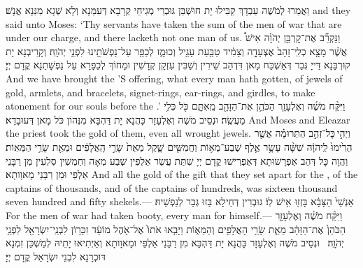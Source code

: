 {וַאֲמַרוּ לְמֹשֶׁה עַבְדָךְ קַבִּילוּ יָת חוּשְׁבַּן גּוּבְרֵי מְגִיחֵי קְרָבָא דְּעִמַּנָא וְלָא שְׁגָא מִנַּנָא אֱנָשׁ׃}
{and they said unto Moses: ‘Thy servants have taken the sum of the men of war that are under our charge, and there lacketh not one man of us.}{}
{וַנַּקְרֵ֞ב אֶת־קׇרְבַּ֣ן יְהֹוָ֗ה אִישׁ֩ אֲשֶׁ֨ר מָצָ֤א כְלִֽי־זָהָב֙ אֶצְעָדָ֣ה וְצָמִ֔יד טַבַּ֖עַת עָגִ֣יל וְכוּמָ֑ז לְכַפֵּ֥ר עַל־נַפְשֹׁתֵ֖ינוּ לִפְנֵ֥י יְהֹוָֽה׃
}
{וְקָרֵיבְנָא יָת קוּרְבָּנָא דַּייָ גְּבַר דְּאַשְׁכַּח מָאן דִּדְהַב שֵׁירִין וְשַׁבִּין עִזְקָן קְדָשִׁין וּמָחוֹךְ לְכַפָּרָא עַל נַפְשָׁתַנָא קֳדָם יְיָ׃}
{And we have brought the \lord’S offering, what every man hath gotten, of jewels of gold, armlets, and bracelets, signet-rings, ear-rings, and girdles, to make atonement for our souls before the \lord.’}{}
{וַיִּקַּ֨ח מֹשֶׁ֜ה וְאֶלְעָזָ֧ר הַכֹּהֵ֛ן אֶת־הַזָּהָ֖ב מֵֽאִתָּ֑ם כֹּ֖ל כְּלִ֥י מַעֲשֶֽׂה׃}
{וּנְסֵיב מֹשֶׁה וְאֶלְעָזָר כָּהֲנָא יָת דַּהְבָּא מִנְּהוֹן כֹּל מָאן דְּעוּבָדָא׃}
{And Moses and Eleazar the priest took the gold of them, even all wrought jewels.}{}
{וַיְהִ֣י \legarmeh  כׇּל־זְהַ֣ב הַתְּרוּמָ֗ה אֲשֶׁ֤ר הֵרִ֙ימוּ֙ לַֽיהֹוָ֔ה שִׁשָּׁ֨ה עָשָׂ֥ר אֶ֛לֶף שְׁבַע־מֵא֥וֹת וַחֲמִשִּׁ֖ים שָׁ֑קֶל מֵאֵת֙ שָׂרֵ֣י הָֽאֲלָפִ֔ים וּמֵאֵ֖ת שָׂרֵ֥י הַמֵּאֽוֹת׃}
{וַהֲוָה כָּל דְּהַב אַפְרָשׁוּתָא דְּאַפְרִישׁוּ קֳדָם יְיָ שִׁתַּת עֲשַׂר אַלְפִין שְׁבַע מְאָה וְחַמְשִׁין סִלְעִין מִן רַבָּנֵי אַלְפֵי וּמִן רַבָּנֵי מָאוָותָא׃}
{And all the gold of the gift that they set apart for the \lord, of the captains of thousands, and of the captains of hundreds, was sixteen thousand seven hundred and fifty shekels.—}{}
{אַנְשֵׁי֙ הַצָּבָ֔א בָּזְז֖וּ אִ֥ישׁ לֽוֹ׃}
{גּוּבְרִין דְּחֵילָא בַּזוּ גְּבַר לְנַפְשֵׁיהּ׃}
{For the men of war had taken booty, every man for himself.—}{}
{וַיִּקַּ֨ח מֹשֶׁ֜ה וְאֶלְעָזָ֤ר הַכֹּהֵן֙ אֶת־הַזָּהָ֔ב מֵאֵ֛ת שָׂרֵ֥י הָאֲלָפִ֖ים וְהַמֵּא֑וֹת וַיָּבִ֤אוּ אֹתוֹ֙ אֶל־אֹ֣הֶל מוֹעֵ֔ד זִכָּר֥וֹן לִבְנֵֽי־יִשְׂרָאֵ֖ל לִפְנֵ֥י יְהֹוָֽה׃ \petucha }
{וּנְסֵיב מֹשֶׁה וְאֶלְעָזָר כָּהֲנָא יָת דַּהְבָּא מִן רַבָּנֵי אַלְפֵי וּמָאוָותָא וְאֵיְתִיאוּ יָתֵיהּ לְמַשְׁכַּן זִמְנָא דּוּכְרָנָא לִבְנֵי יִשְׂרָאֵל קֳדָם יְיָ׃}
